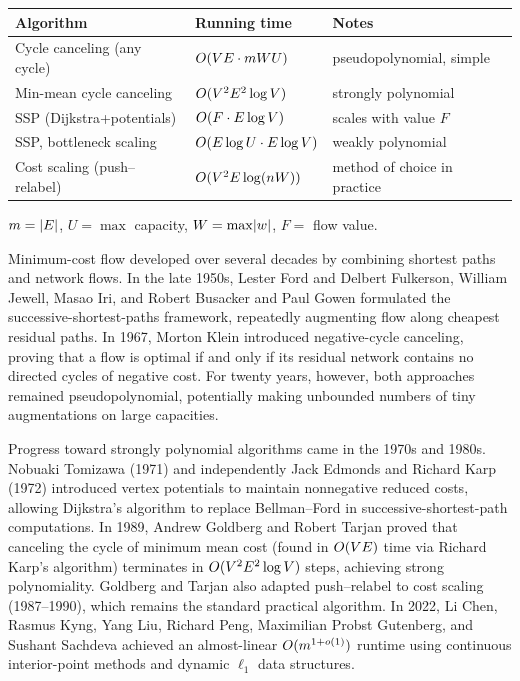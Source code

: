 \begin{complexitybox}
\begin{center}
\begin{tabular}{lll}
\toprule
Algorithm & Running time & Notes \\
\midrule
Cycle canceling (any cycle) & $O(VE\cdot mWU)$ & pseudopolynomial, simple \\
Min-mean cycle canceling & $O(V^2E^2\log V)$ & strongly polynomial \\
SSP (Dijkstra+potentials) & $O(F\cdot E\log V)$ & scales with value $F$ \\
SSP, bottleneck scaling & $O(E\log U\cdot E\log V)$ & weakly polynomial \\
Cost scaling (push--relabel) & $O(V^2E\log(nW))$ & method of choice in practice \\
\bottomrule
\end{tabular}
\end{center}
$m=\lvert E\rvert$, $U=\max$ capacity, $W=\max\lvert w\rvert$, $F=$ flow value.
\end{complexitybox}

\begin{historybox}
Minimum-cost flow developed over several decades by combining shortest paths and network flows.
In the late 1950s, Lester Ford and Delbert Fulkerson, William Jewell, Masao Iri, and Robert Busacker and
Paul Gowen formulated the successive-shortest-paths framework, repeatedly augmenting flow along cheapest
residual paths. In 1967, Morton Klein introduced negative-cycle canceling, proving that a flow is optimal
if and only if its residual network contains no directed cycles of negative cost. For twenty years, however,
both approaches remained pseudopolynomial, potentially making unbounded numbers of tiny augmentations on
large capacities.

Progress toward strongly polynomial algorithms came in the 1970s and 1980s. Nobuaki Tomizawa (1971)
and independently Jack Edmonds and Richard Karp (1972) introduced vertex potentials to maintain nonnegative
reduced costs, allowing Dijkstra's algorithm to replace Bellman--Ford in successive-shortest-path computations.
In 1989, Andrew Goldberg and Robert Tarjan proved that canceling the cycle of minimum mean cost (found in
$O(VE)$ time via Richard Karp's algorithm) terminates in $O(V^2E^2\log V)$ steps, achieving strong
polynomiality. Goldberg and Tarjan also adapted push--relabel to cost scaling (1987--1990), which remains the
standard practical algorithm. In 2022, Li Chen, Rasmus Kyng, Yang Liu, Richard Peng, Maximilian Probst
Gutenberg, and Sushant Sachdeva achieved an almost-linear $O(m^{1+o(1)})$ runtime using continuous
interior-point methods and dynamic $\ell_1$ data structures.
\end{historybox}

